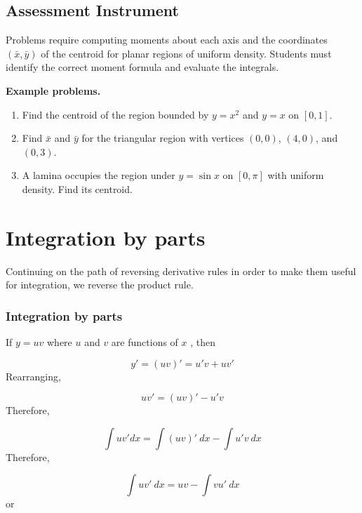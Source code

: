 \subsection{Assessment Instrument}
\label{ssec:mome-9a2a}

Problems require computing moments about each axis and the coordinates $(\bar{x}, \bar{y})$ of the centroid for planar regions of uniform density. Students must identify the correct moment formula and evaluate the integrals.

\textbf{Example problems.}

\begin{enumerate}
    \item Find the centroid of the region bounded by $y = x^2$ and $y = x$ on $[0,1]$.
    \item Find $\bar{x}$ and $\bar{y}$ for the triangular region with vertices $(0,0)$, $(4,0)$, and $(0,3)$.
    \item A lamina occupies the region under $y = \sin x$ on $[0,\pi]$ with uniform density. Find its centroid.
\end{enumerate}

\section{Integration by parts}
\label{sec:inte-5441}

Continuing on the path of reversing derivative rules in order to make them useful for integration, we reverse the product rule.


\subsubsection{Integration by parts}
\label{sss:inte-5441}


If $y=uv$ where $u$ and $v$ are functions of $x$ , then


\[
y'=(uv)'=u'v+uv'
\] Rearranging,


\[
uv'=(uv)'-u'v
\] Therefore,


\[
\int uv'dx=\int (uv)'\ dx-\int u'v\ dx
\] Therefore,


\[
\int uv'\ dx=uv-\int vu'\ dx
\] or


